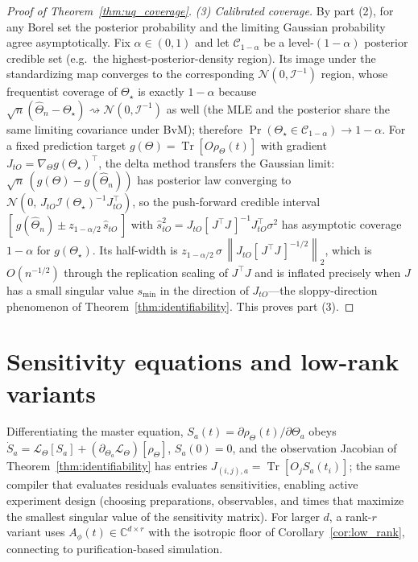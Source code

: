 \documentclass[twocolumn,aps,prxquantum,superscriptaddress,nofootinbib,floatfix,longbibliography]{revtex4-2}
\DeclareMathOperator{\Tr}{Tr}
\newcommand{\C}{\mathbb{C}}
\newcommand{\calL}{\mathcal{L}}
\newcommand{\norm}[1]{\left\lVert #1 \right\rVert}
\newcommand{\Thetahat}{\widehat{\Theta}}
\begin{document}
\begin{proof}[Proof of Theorem~\ref{thm:uq_coverage}]
\emph{(3) Calibrated coverage.} By part (2), for any Borel set the posterior probability and the limiting Gaussian probability agree asymptotically. Fix $\alpha\in(0,1)$ and let $\mathcal{C}_{1-\alpha}$ be a level-$(1-\alpha)$ posterior credible set (e.g.\ the highest-posterior-density region). Its image under the standardizing map converges to the corresponding $\mathcal{N}(0,\mathcal{I}^{-1})$ region, whose frequentist coverage of $\Theta_\star$ is exactly $1-\alpha$ because $\sqrt n(\Thetahat_n-\Theta_\star)\rightsquigarrow\mathcal{N}(0,\mathcal{I}^{-1})$ as well (the MLE and the posterior share the same limiting covariance under BvM); therefore $\Pr(\Theta_\star\in\mathcal{C}_{1-\alpha})\to1-\alpha$. For a fixed prediction target $g(\Theta)=\Tr[O\rho_\Theta(t)]$ with gradient $J_{tO}=\nabla_\Theta g(\Theta_\star)^\top$, the delta method transfers the Gaussian limit: $\sqrt n\,(g(\Theta)-g(\Thetahat_n))$ has posterior law converging to $\mathcal{N}(0,\,J_{tO}\mathcal{I}(\Theta_\star)^{-1}J_{tO}^\top)$, so the push-forward credible interval $[\,g(\Thetahat_n)\pm z_{1-\alpha/2}\,\hat s_{tO}\,]$ with $\hat s_{tO}^2=J_{tO}[\,J^\top J\,]^{-1}J_{tO}^\top\sigma^2$ has asymptotic coverage $1-\alpha$ for $g(\Theta_\star)$. Its half-width is $z_{1-\alpha/2}\,\sigma\,\norm{J_{tO}[\,J^\top J\,]^{-1/2}}_2$, which is $O(n^{-1/2})$ through the replication scaling of $J^\top J$ and is inflated precisely when $J$ has a small singular value $s_{\min}$ in the direction of $J_{tO}$---the sloppy-direction phenomenon of Theorem~\ref{thm:identifiability}. This proves part (3).
\end{proof}

\section{Sensitivity equations and low-rank variants}
\label{sec:sensitivity_equations}
Differentiating the master equation, $S_a(t)=\partial\rho_\Theta(t)/\partial\Theta_a$ obeys $\dot S_a=\calL_\Theta[S_a]+(\partial_{\Theta_a}\calL_\Theta)[\rho_\Theta]$, $S_a(0)=0$, and the observation Jacobian of Theorem~\ref{thm:identifiability} has entries $J_{(i,j),a}=\Tr[O_j S_a(t_i)]$; the same compiler that evaluates residuals evaluates sensitivities, enabling active experiment design (choosing preparations, observables, and times that maximize the smallest singular value of the sensitivity matrix). For larger $d$, a rank-$r$ variant uses $A_\phi(t)\in\C^{d\times r}$ with the isotropic floor of Corollary~\ref{cor:low_rank}, connecting to purification-based simulation.
\end{document}
